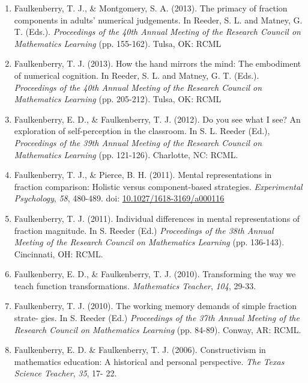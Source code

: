 \documentclass[article,10pt]{article}
\begin{document}
\begin{enumerate}
\item Faulkenberry, T. J., \& Montgomery, S. A. (2013). The primacy of fraction components in adults’ numerical judgements. In Reeder, S. L. and Matney, G. T. (Eds.). \emph{Proceedings of the 40th Annual Meeting of the Research Council on Mathematics Learning} (pp. 155-162). Tulsa, OK: RCML
\item Faulkenberry, T. J. (2013). How the hand mirrors the mind: The embodiment of numerical cognition. In Reeder, S. L. and Matney, G. T. (Eds.). \emph{Proceedings of the 40th Annual Meeting of the Research Council on Mathematics Learning} (pp. 205-212). Tulsa, OK: RCML
\item Faulkenberry, E. D., \& Faulkenberry, T. J. (2012). Do you see what I see? An exploration of self-perception in the classroom. In S. L. Reeder (Ed.), \emph{Proceedings of the 39th Annual Meeting of the Research Council on Mathematics Learning} (pp. 121-126). Charlotte, NC: RCML.
\item Faulkenberry, T. J., \& Pierce, B. H. (2011). Mental representations in fraction comparison: Holistic versus component-based strategies. \emph{Experimental Psychology}, \emph{58}, 480-489. doi: \href{http://dx.doi.org/10.1027/1618-3169/a000116}{10.1027/1618-3169/a000116}
\item Faulkenberry, T. J. (2011). Individual differences in mental representations of fraction magnitude. In S. Reeder (Ed.) \emph{Proceedings of the 38th Annual Meeting of the Research Council on Mathematics Learning} (pp. 136-143). Cincinnati, OH: RCML.
\item Faulkenberry, E. D., \& Faulkenberry, T. J. (2010). Transforming the way we teach function transformations. \emph{Mathematics Teacher}, \emph{104}, 29-33.
\item Faulkenberry, T. J. (2010). The working memory demands of simple fraction strate- gies. In S. Reeder (Ed.) \emph{Proceedings of the 37th Annual Meeting of the Research Council on Mathematics Learning} (pp. 84-89). Conway, AR: RCML.
\item Faulkenberry, E. D. \& Faulkenberry, T. J. (2006). Constructivism in mathematics education: A historical and personal perspective. \emph{The Texas Science Teacher}, \emph{35}, 17- 22.
\end{enumerate}
\end{document}
